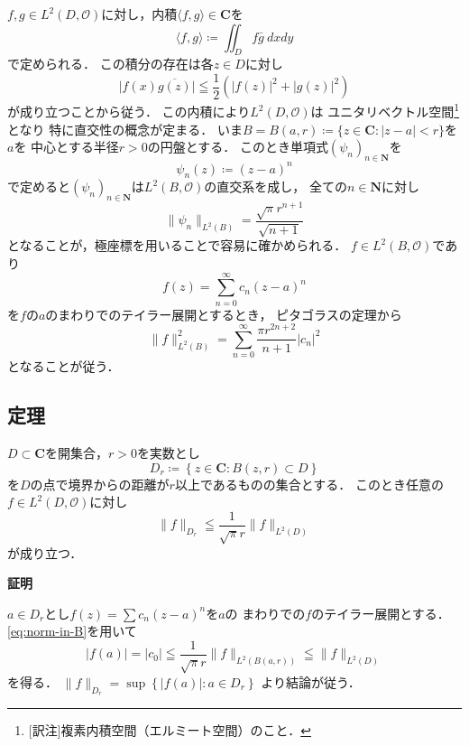 \documentclass[11pt, a4paper, dvipdfmx]{jsarticle}
\makeatletter
\theoremstyle{definition}
\newcommand{\nn}{\mathbf{N}}
\newcommand{\cc}{\mathbf{C}}
\newcommand{\mcal}{\mathcal}
\newcommand{\OO}{\mcal{O}}
\newcommand{\abs}[1]{\lvert #1 \rvert}
\newcommand{\nm}[1]{\lVert #1 \rVert}
\theoremstyle{mystyle}
\renewcommand{\proofname}{\textbf{証明}}
\renewenvironment{proof}[1][\proofname]{\par
  \pushQED{\qed}%
  \normalfont \topsep6\p@\@plus6\p@\relax
  \trivlist
  \item\relax
  {\bfseries%
  #1\@addpunct{.}}\hspace\labelsep\ignorespaces
}{%
  \popQED\endtrivlist\@endpefalse
}
\numberwithin{equation}{section} %
\def\inner<#1>{\langle #1 \rangle}
\makeatother
\begin{document}
$f,g\in L^2(D,\OO)$に対し，内積$\inner<f,g>\in\cc$を
\begin{equation*}
  \inner<f,g>\coloneqq\iint_D f\bar{g}~dxdy
\end{equation*}
で定められる．
この積分の存在は各$z\in D$に対し
\begin{equation*}
  \abs{f(x)\overline{g(z)}}
  \leqq\frac{1}{2}\left(\abs{f(z)}^2+\abs{g(z)}^2\right)
\end{equation*}
が成り立つことから従う．
この内積により$L^2(D,\OO)$は
ユニタリベクトル空間\footnote{
  [訳注]複素内積空間（エルミート空間）のこと．
}となり
特に直交性の概念が定まる．
いま$B=B(a,r)\coloneqq\{z\in\cc: \abs{z-a}<r\}$を$a$を
中心とする半径$r>0$の円盤とする．
このとき単項式$(\psi_n)_{n\in\nn}$を
\begin{equation*}
  \psi_n(z)\coloneqq(z-a)^n
\end{equation*}
で定めると$(\psi_n)_{n\in\nn}$は$L^2(B,\OO)$の直交系を成し，
全ての$n\in\nn$に対し
\begin{equation*}
  \nm{\psi_n}_{L^2(B)}=\frac{\sqrt{\pi}r^{n+1}}{\sqrt{n+1}}
\end{equation*}
となることが，極座標を用いることで容易に確かめられる．
$f\in L^2(B,\OO)$であり
\begin{equation*}
  f(z)=\sum_{n=0}^{\infty}c_n(z-a)^n
\end{equation*}
を$f$の$a$のまわりでのテイラー展開とするとき，
ピタゴラスの定理から
\begin{equation*}
  \nm{f}^2_{L^2(B)}
  =\sum_{n=0}^{\infty}
  \frac{\pi r^{2n+2}}{n+1}\abs{c_n}^2\tag{$\ast$}\label{eq:norm-in-B}
\end{equation*}
となることが従う．

\subsection{定理}\label{thm:norm}
$D\subset\cc$を開集合，$r>0$を実数とし
\begin{equation*}
  D_r\coloneqq\left\{z\in\cc:B(z,r)\subset D\right\}
\end{equation*}
を$D$の点で境界からの距離が$r$以上であるものの集合とする．
このとき任意の$f\in L^2(D,\OO)$に対し
\begin{equation*}
  \nm{f}_{D_r}\leqq \frac{1}{\sqrt{\pi}r}\nm{f}_{L^2(D)}
\end{equation*}
が成り立つ．

\begin{proof}
  $a\in D_{r}$とし$f(z)=\sum c_n(z-a)^n$を$a$の
  まわりでの$f$のテイラー展開とする．
  \eqref{eq:norm-in-B}を用いて
  \begin{equation*}
    \abs{f(a)}=\abs{c_0}\leqq\frac{1}{\sqrt{\pi}r}\nm{f}_{L^2(B(a,r))}\leqq\nm{f}_{L^2(D)}
  \end{equation*}
  を得る．
  $\nm{f}_{D_r}=\sup\left\{\abs{f(a)}\colon a\in D_r\right\}$
  より結論が従う．
\end{proof}
\end{document}
